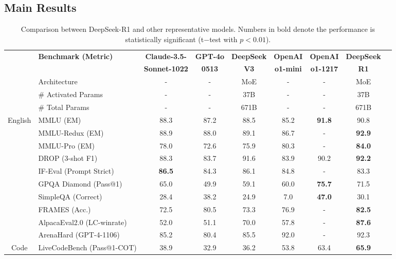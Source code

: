 \documentclass[11pt, a4paper, logo, copyright, nonumbering]{deepseek}
\newcommand{\dsri}{DeepSeek-R1}
\begin{document}
\begin{CJK*}{UTF8}{gbsn}
\subsection{Main Results}
\begin{table}[h]
    \centering
    \footnotesize
    \setlength{\tabcolsep}{1.9pt}
    \caption{ Comparison between \dsri{} and other representative models.  Numbers in bold denote the performance is statistically significant  (t$-$test with $p < 0.01$).
    }
    \begin{tabular}{@{}c l | c  c  c | c c |c c @{}}
    \toprule
    & \multirow{2}{*}{\centering \textbf{Benchmark {\tiny (Metric)}}}  & \textbf{Claude-3.5-}  & \textbf{GPT-4o}& \textbf{DeepSeek} & \textbf{OpenAI} & \textbf{OpenAI} & \textbf{DeepSeek} \\
    & & \textbf{Sonnet-1022}  & \textbf{0513} & \textbf{V3} & \textbf{o1-mini}& \textbf{o1-1217} &\textbf{R1} \\
    \midrule
    & Architecture &-&- & MoE &-&-& MoE \\
    & \# Activated Params& -&-& 37B&-&- & 37B \\
    & \# Total Params &-&-& 671B&-&- & 671B \\
    \midrule
    \multirow{10}{*}{English}& MMLU {\tiny (EM)} & 88.3&87.2 & 88.5 & 85.2 & \textbf{91.8} & 90.8\\
     & MMLU-Redux {\tiny (EM)}& 88.9& 88.0 & 89.1 & 86.7&- & \textbf{92.9} \\
    & MMLU-Pro {\tiny (EM)}  & 78.0 & 72.6 & 75.9 & 80.3 &-& \textbf{84.0} \\
    & DROP {\tiny (3-shot F1)}  & 88.3 & 83.7 & 91.6 & 83.9 & 90.2 & \textbf{92.2} \\
    & IF-Eval {\tiny (Prompt Strict)}  & \textbf{86.5} & 84.3 & 86.1 & 84.8&- & 83.3 \\
    & GPQA Diamond {\tiny (Pass@1)}& 65.0 & 49.9 & 59.1 & 60.0 & \textbf{75.7} & 71.5 \\
    & SimpleQA {\tiny (Correct)} & 28.4 & 38.2& 24.9 & 7.0 & \textbf{47.0} & 30.1\\
     & FRAMES {\tiny (Acc.)}  & 72.5 & 80.5 & 73.3 & 76.9 & -&\textbf{82.5}  \\
      & AlpacaEval2.0 {\tiny (LC-winrate)}  & 52.0 &  51.1 & 70.0 & 57.8 & - & \textbf{87.6}\\
       & ArenaHard {\tiny (GPT-4-1106)}  & 85.2 & 80.4 & 85.5 & 92.0 & - & 92.3\\
    \midrule
    \multirow{4}{*}{Code} & LiveCodeBench {\tiny (Pass@1-COT)} & 38.9 & 32.9 & 36.2 & 53.8 & 63.4 & \textbf{65.9} \\

\end{tabular}
\end{table}
\end{CJK*}
\end{document}
